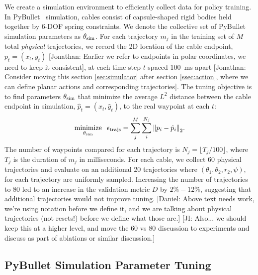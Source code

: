 \documentclass[letterpaper, 10 pt, conference]{ieeeconf}  %
\DeclareMathOperator*{\minimize}{minimize}
\newcommand{\remark}[3]{{\color{#2}[#1: #3]}}
\newcommand{\daniel}[1]{\remark{Daniel}{blue}{#1}}
\newcommand{\jonathan}[1]{\remark{Jonathan}{cyan}{#1}}
\newcommand{\jeffi}[1]{\remark{JI}{red}{#1}}
\begin{document}
We create a simulation environment to efficiently collect data for policy training. In PyBullet~\cite{coumans2019} simulation, cables consist of capsule-shaped rigid bodies held together by 6-DOF spring constraints. We denote the collective set of PyBullet simulation parameters as $\theta_{\rm sim}$. For each trajectory $m_j$ in the training set of $M$ total \emph{physical} trajectories, we record the 2D location of the cable endpoint, $p_t = (x_t, y_t)$ \jonathan{Earlier we refer to endpoints in polar coordinates, we need to keep it consistent}, at each time step $t$ spaced \SI{100}{\milli\second} apart \jonathan{Consider moving this section \ref{sec:simulator} after section \ref{ssec:action}, where we can define planar actions and corresponding trajectories}. The tuning objective is to find parameters $\theta_{\rm sim}$ that minimize the average $L^2$ distance between the cable endpoint in simulation, $\hat{p}_t = (\hat{x}_t, \hat{y}_t)$, to the real waypoint at each $t$:
\begin{equation}\label{eq:tuning}
    \minimize_{\theta_{\rm sim}} \;\; \epsilon_{\rm trajs} = {\sum_{j}^M{\sum_i^{N_j}{\lVert p_i - \hat{p}_i \rVert}_2}}.
\end{equation}
The number of waypoints compared for each trajectory is $N_j = \lfloor {T_j}/{100} \rfloor$, where $T_j$ is the duration of $m_j$ in milliseconds. For each cable, we collect 60 physical trajectories and evaluate on an additional 20 trajectories where $(\theta_1, \theta_2, r_2, \psi)$, for each trajectory are uniformly sampled. Increasing the number of trajectories to 80 led to an increase in the validation metric $D$ by $2\% - 12\%$, suggesting that additional trajectories would not improve tuning. \daniel{Above text needs work, we're using notation before we define it, and we are talking about physical trajectories (not resets!) before we define what those are.} \jeffi{Also... we should keep this at a higher level, and move the 60 vs 80 discussion to experiments and discuss as part of ablations or similar discussion.}


\subsection{PyBullet Simulation Parameter Tuning}

\end{document}

